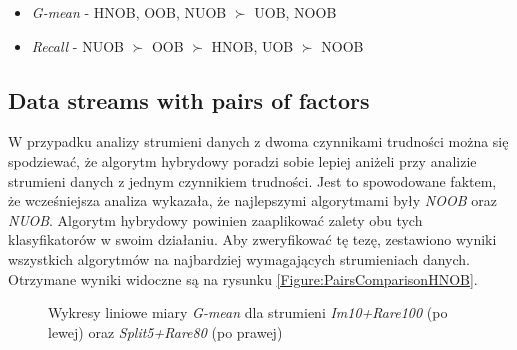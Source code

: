 \begin{itemize}
    \item \textit{G-mean} - HNOB, OOB, NUOB $\succ$ UOB, NOOB
    \item \textit{Recall} - NUOB $\succ$ OOB $\succ$ HNOB, UOB $\succ$ NOOB
\end{itemize}

\subsection{Data streams with pairs of factors}

\noindent W przypadku analizy strumieni danych z dwoma czynnikami trudności można się spodziewać, że algorytm hybrydowy poradzi sobie lepiej aniżeli przy analizie strumieni danych z jednym czynnikiem trudności. Jest to spowodowane faktem, że wcześniejsza analiza wykazała, że najlepszymi algorytmami były \textit{NOOB} oraz \textit{NUOB}. Algorytm hybrydowy powinien zaaplikować zalety obu tych klasyfikatorów w swoim działaniu. Aby zweryfikować tę tezę, zestawiono wyniki wszystkich algorytmów na najbardziej wymagających strumieniach danych. Otrzymane wyniki widoczne są na rysunku \ref{Figure:PairsComparisonHNOB}.

\begin{figure}[h]
    \centering
    \qquad
    \caption{Wykresy liniowe miary \textit{G-mean} dla strumieni \textit{Im10+Rare100} (po lewej) oraz \textit{Split5+Rare80} (po prawej)}\label{Figure:PairsFactorsHNOB}
\end{figure}

